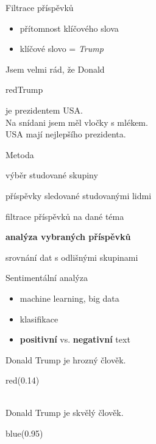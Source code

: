 \documentclass[notheorems,12pt]{beamer}
\newcommand{\cmark}{\ding{51}} %
\newcommand{\xmark}{\ding{55}} %
\begin{document}
\begin{frame}{Filtrace příspěvků}
\begin{itemize}
    \item přítomnost klíčového slova
    \item klíčové slovo = \textit{Trump}
\end{itemize}
\center
Jsem velmi rád, že Donald \begin{color}{red}Trump\end{color} je prezidentem USA. \cmark\\
\vspace{0.2cm}
Na snídani jsem měl vločky s mlékem. \xmark\\
\vspace{0.2cm}
USA mají nejlepšího prezidenta. \xmark\\
\end{frame}
\begin{frame}{Metoda}
    \begin{enumerate}
        \begin{large}
        \item výběr studované skupiny
        \vspace{0.25cm}
        \item příspěvky sledované studovanými lidmi
        \vspace{0.25cm}
        \item filtrace příspěvků na dané téma
        \vspace{0.25cm}
        \item\bfseries analýza vybraných příspěvků
        \vspace{0.25cm}
        \item srovnání dat s odlišnými skupinami
        \end{large}
    \end{enumerate}
\end{frame}
\begin{frame}{Sentimentální analýza}
\begin{itemize}
    \item machine learning, big data
    \item klasifikace
    \item \textbf{positivní} vs. \textbf{negativní} text
\end{itemize}
\center
Donald Trump je hrozný člověk.\\
\begin{color}{red}(0.14)\end{color}\\
\vspace{0.5cm}
Donald Trump je skvělý člověk.\\
\begin{color}{blue}(0.95)\end{color}
\end{frame}
\end{document}
